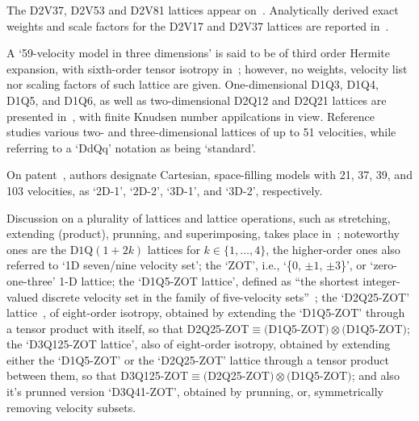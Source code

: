     The D2V37, D2V53 and D2V81 lattices appear on~\cite{2007-PhilippiPC+DosSantosLOE-IntJModPhysC}. Analytically  derived  exact
    weights and scale factors for the D2V17 and D2V37 lattices are reported in~\cite{2007-SiebertDN+PhilippiPC-IntJModPhysC}.

    A `59-velocity model in three dimensions' is said to be of third order Hermite expansion, with sixth-order  tensor  isotropy
    in~\cite{2008-ChenH+ShanX-PhysD}; however, no weights, velocity  list  nor  scaling  factors  of  such  lattice  are  given.
    One-dimensional  D1Q3,  D1Q4,  D1Q5,  and  D1Q6,  as  well  as  two-dimensional  D2Q12  and  D2Q21  lattices  are  presented
    in~\cite{2008-KimSH+BoydID-JComputPhys},      with      finite      Knudsen      number      appilcations      in      view.
    Reference~\cite{2008-RubinsteinR+LuoLS-PhysRev} studies various two- and three-dimensional lattices of up to 51  velocities,
    while referring to a `DdQq' notation as being `standard'.

    On patent~\cite{2008-ShanX+ZhangR-USPat}, authors designate Cartesian,  space-filling  models  with  21,  37,  39,  and  103
    velocities, as `2D-1', `2D-2', `3D-1', and `3D-2', respectively.

    Discussion on a plurality of lattices and lattice  operations,  such  as  stretching,  extending  (product),  prunning,  and
    superimposing, takes place in~\cite{2009-ChikatamarlaSS+KarlinIV-PhysRevE}; noteworthy ones are the  D$1$Q$(1+2k)$  lattices
    for $k \in \{1, \ldots, 4\}$, the higher-order ones also referred to `1D seven/nine velocity set'; the `ZOT', i.e.,  `\{$0$,
    $\pm 1$, $\pm 3$\}', or  `zero-one-three'  1-D  lattice;  the  `D1Q5-ZOT  lattice',  defined  as  ``{\swshape  the  shortest
    integer-valued        discrete        velocity        set        in        the        family        of         five-velocity
    sets\/}''~\cite{2006-ChikatamarlaSS+KarlinIV-PhysRevLett};                          the                          `D2Q25-ZOT'
    lattice~\cite{2008-ChikatamarlaSS+KarlinIV-CompPhysComm}, of eight-order isotropy,  obtained  by  extending  the  `D1Q5-ZOT'
    through a tensor product with itself, so that D2Q25-ZOT$\equiv($D1Q5-ZOT$) \otimes ($D1Q5-ZOT$)$; the `D3Q125-ZOT  lattice',
    also of eight-order iso\-tro\-py, obtained by extending either the `D1Q5-ZOT' or the `D2Q25-ZOT' lattice  through  a  tensor
    product between  them,  so  that  D3Q125-ZOT$\equiv($D2Q25-ZOT$)  \otimes  ($D1Q5-ZOT$)$;  and  also  it's  prunned  version
    `D3Q41-ZOT', obtained by prunning, or, symmetrically removing velocity subsets.

